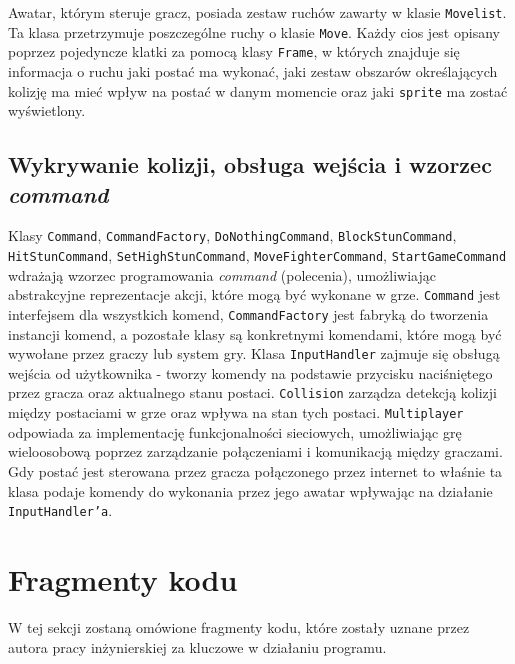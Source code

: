 Awatar, którym steruje gracz, posiada zestaw ruchów zawarty w klasie \texttt{Movelist}. Ta klasa przetrzymuje poszczególne ruchy o klasie \texttt{Move}. Każdy cios jest opisany poprzez pojedyncze klatki za pomocą klasy \texttt{Frame}, w których znajduje się informacja o ruchu jaki postać ma wykonać, jaki zestaw obszarów określających kolizję ma mieć wpływ na postać w danym momencie oraz jaki \texttt{sprite} ma zostać wyświetlony.

\subsection{Wykrywanie kolizji, obsługa wejścia i wzorzec \emph{command} \cite{GPP}}
Klasy \texttt{Command}, \texttt{CommandFactory}, \texttt{DoNothingCommand}, \texttt{BlockStunCommand}, \texttt{HitStunCommand}, \texttt{SetHighStunCommand}, \texttt{MoveFighterCommand}, \texttt{StartGameCommand} wdrażają wzorzec programowania \emph{command} (polecenia), umożliwiając abstrakcyjne reprezentacje akcji, które mogą być wykonane w grze. \texttt{Command} jest interfejsem dla wszystkich komend, \texttt{CommandFactory} jest fabryką do tworzenia instancji komend, a pozostałe klasy są konkretnymi komendami, które mogą być wywołane przez graczy lub system gry. Klasa \texttt{InputHandler} zajmuje się obsługą wejścia od użytkownika - tworzy komendy na podstawie przycisku naciśniętego przez gracza oraz aktualnego stanu postaci. \texttt{Collision} zarządza detekcją kolizji między postaciami w grze oraz wpływa na stan tych postaci. \texttt{Multiplayer} odpowiada za implementację funkcjonalności sieciowych, umożliwiając grę wieloosobową poprzez zarządzanie połączeniami i komunikacją między graczami. Gdy postać jest sterowana przez gracza połączonego przez internet to właśnie ta klasa podaje komendy do wykonania przez jego awatar wpływając na działanie \texttt{InputHandler'a}.

\section{Fragmenty kodu}
W tej sekcji zostaną omówione fragmenty kodu, które zostały uznane przez autora pracy inżynierskiej za kluczowe w działaniu programu.
